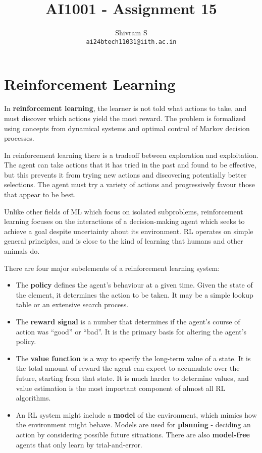 \documentclass{article}
\author{Shivram S \\ \texttt{ai24btech11031@iith.ac.in}}
\title{AI1001 - Assignment 15}
\begin{document}
\maketitle

\section{Reinforcement Learning}

In \textbf{reinforcement learning}, the learner is not told what actions
to take, and must discover which actions yield the most reward. The
problem is formalized using concepts from dynamical systems and 
optimal control of Markov decision processes.

In reinforcement learning there is a tradeoff between exploration and
exploitation. The agent can take actions that it has tried in the past
and found to be effective, but this prevents it from trying new actions
and discovering potentially better selections. The agent must try 
a variety of actions and progressively favour those that appear to
be best.

Unlike other fields of ML which focus on isolated subproblems,
reinforcement learning focuses on the interactions of a decision-making
agent which seeks to achieve a goal despite uncertainty about its 
environment.  RL operates on simple general
principles, and is close to the kind of learning that humans and
other animals do.

There are four major subelements of a reinforcement learning system:
\begin{itemize}
    \item The \textbf{policy} defines the agent's behaviour at a
    given time. Given the state of the element, it determines the
    action to be taken. It may be a simple lookup table or an extensive
    search process.
    \item The \textbf{reward signal} is a number that determines if
    the agent's course of action was ``good'' or ``bad''.
    It is the primary basis for altering the agent's policy.
    \item The \textbf{value function} is a way to specify the
    long-term value of a state. It is the total amount of reward
    the agent can expect to accumulate over the future, starting
    from that state. It is much harder to determine values, and
    value estimation is the most important component of almost
    all RL algorithms.
    \item An RL system might include a \textbf{model} of the environment,
    which mimics how the environment might behave. Models are used for
    \textbf{planning} - deciding an action by considering possible future
    situations. There are also \textbf{model-free} agents that only
    learn by trial-and-error.
\end{itemize}
\end{document}
